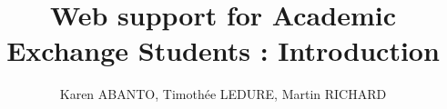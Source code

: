 \documentclass[a4paper]{article}
\begin{document}
\title{Web support for Academic Exchange Students : Introduction}
\author{Karen ABANTO, Timothée LEDURE, Martin RICHARD}

\maketitle
{}





\end{document}
